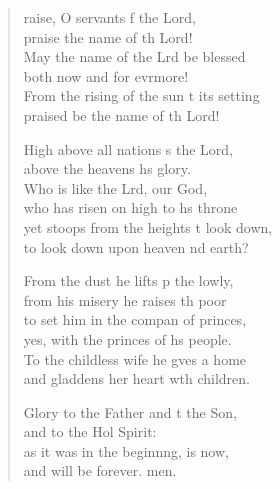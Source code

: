 \settowidth{\versewidth}{From the rising of the sun to its setting *}
\begin{verse}%
  \begin{patverse}
raise, O servants f the Lord,\Med\\
praise the name of th Lord!\\
May the name of the Lrd be blessed\Med\\
both now and for evrmore!\\
From the rising of the sun t its setting\Med\\
praised be the name of th Lord!

High above all nations \pointup{\i}s the Lord,\Med\\
above the heavens h\pointup{\i}s glory.\\
Who is like the Lrd, our God,\Med\\
who has risen on high to h\pointup{\i}s throne\\
yet stoops from the heights t look down,\Med\\
to look down upon heaven nd earth?

From the dust he lifts p the lowly,\Med\\
from his misery he raises th poor\\
to set him in the compan of princes,\Med\\
yes, with the princes of h\pointup{\i}s people.\\
To the childless wife he g\pointup{\i}ves a home\Med\\
and gladdens her heart w\pointup{\i}th children.

Glory to the Father and t the Son,\Med\\
and to the Hol Spirit:\\
as it was in the beginn\pointup{\i}ng, is now,\Med\\
and will be forever. men.
  \end{patverse}
\end{verse}
